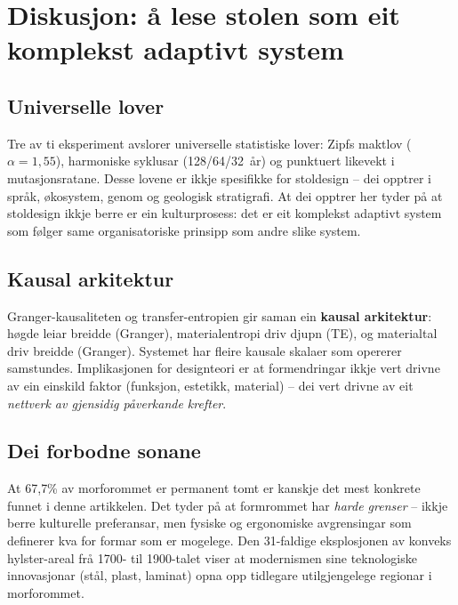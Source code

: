 \documentclass[10pt, a4paper, twocolumn]{article}
\begin{document}
\section{Diskusjon: \aa{} lese stolen som eit komplekst adaptivt system}

\subsection{Universelle lover}

Tre av ti eksperiment avslorer universelle statistiske lover: Zipfs maktlov ($\alpha = 1{,}55$), harmoniske syklusar (128/64/32~\aa{}r) og punktuert likevekt i mutasjonsratane. Desse lovene er ikkje spesifikke for stoldesign -- dei opptrer i spr\aa{}k, \o{}kosystem, genom og geologisk stratigrafi. At dei opptrer her tyder p\aa{} at stoldesign ikkje berre er ein kulturprosess: det er eit komplekst adaptivt system \citep{holland1995} som f\o{}lger same organisatoriske prinsipp som andre slike system.

\subsection{Kausal arkitektur}

Granger-kausaliteten og transfer-entropien gir saman ein \textbf{kausal arkitektur}: h\o{}gde leiar breidde (Granger), materialentropi driv djupn (TE), og materialtal driv breidde (Granger). Systemet har fleire kausale skalaer som opererer samstundes. Implikasjonen for designteori er at formendringar ikkje vert drivne av ein einskild faktor (funksjon, estetikk, material) -- dei vert drivne av eit \emph{nettverk av gjensidig p\aa{}verkande krefter}.

\subsection{Dei forbodne sonane}

At 67{,}7\% av morforommet er permanent tomt er kanskje det mest konkrete funnet i denne artikkelen. Det tyder p\aa{} at formrommet har \emph{harde grenser} -- ikkje berre kulturelle preferansar, men fysiske og ergonomiske avgrensingar som definerer kva for formar som er mogelege. Den 31-faldige eksplosjonen av konveks hylster-areal fr\aa{} 1700- til 1900-talet viser at modernismen sine teknologiske innovasjonar (st\aa{}l, plast, laminat) opna opp tidlegare utilgjengelege regionar i morforommet.
\end{document}
